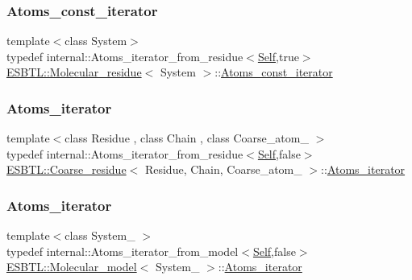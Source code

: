 \mbox{\label{group__grp__iters_gab312d7a420670665b99a379b51825c9c}} 
\subsubsection{\texorpdfstring{Atoms\+\_\+const\+\_\+iterator}{Atoms\_const\_iterator}\hspace{0.1cm}{\footnotesize\ttfamily [4/4]}}
{\footnotesize\ttfamily template$<$class System$>$ \\
typedef internal\+::\+Atoms\+\_\+iterator\+\_\+from\+\_\+residue$<$\hyperlink{classESBTL_1_1Molecular__residue}{Self},true$>$ \hyperlink{classESBTL_1_1Molecular__residue}{E\+S\+B\+T\+L\+::\+Molecular\+\_\+residue}$<$ System $>$\+::\hyperlink{group__grp__iters_gab312d7a420670665b99a379b51825c9c}{Atoms\+\_\+const\+\_\+iterator}}

\mbox{\label{group__grp__iters_ga8081408a6d91ed2a777111e2b2651ad4}} 
\subsubsection{\texorpdfstring{Atoms\+\_\+iterator}{Atoms\_iterator}\hspace{0.1cm}{\footnotesize\ttfamily [1/4]}}
{\footnotesize\ttfamily template$<$class Residue , class Chain , class Coarse\+\_\+atom\+\_\+ $>$ \\
typedef internal\+::\+Atoms\+\_\+iterator\+\_\+from\+\_\+residue$<$\hyperlink{classESBTL_1_1Coarse__residue}{Self},false$>$ \hyperlink{classESBTL_1_1Coarse__residue}{E\+S\+B\+T\+L\+::\+Coarse\+\_\+residue}$<$ Residue, Chain, Coarse\+\_\+atom\+\_\+ $>$\+::\hyperlink{group__grp__iters_ga8081408a6d91ed2a777111e2b2651ad4}{Atoms\+\_\+iterator}}

\mbox{\label{group__grp__iters_ga458a89ea78f235b807ca0d2dfd9a0427}} 
\subsubsection{\texorpdfstring{Atoms\+\_\+iterator}{Atoms\_iterator}\hspace{0.1cm}{\footnotesize\ttfamily [2/4]}}
{\footnotesize\ttfamily template$<$class System\+\_\+ $>$ \\
typedef internal\+::\+Atoms\+\_\+iterator\+\_\+from\+\_\+model$<$\hyperlink{classESBTL_1_1Molecular__model}{Self},false$>$ \hyperlink{classESBTL_1_1Molecular__model}{E\+S\+B\+T\+L\+::\+Molecular\+\_\+model}$<$ System\+\_\+ $>$\+::\hyperlink{group__grp__iters_ga458a89ea78f235b807ca0d2dfd9a0427}{Atoms\+\_\+iterator}}

